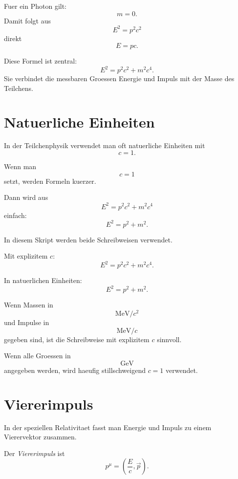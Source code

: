 \begin{examplebox}
Fuer ein Photon gilt:
\[
    m=0.
\]
Damit folgt aus
\[
    E^2=p^2c^2
\]
direkt
\[
    E=pc.
\]
\end{examplebox}

\begin{examtipbox}
Diese Formel ist zentral:
\[
    E^2=p^2c^2+m^2c^4.
\]
Sie verbindet die messbaren Groessen Energie und Impuls mit der Masse des Teilchens.
\end{examtipbox}

\section{Natuerliche Einheiten}

In der Teilchenphysik verwendet man oft natuerliche Einheiten mit
\[
    c=1.
\]

\begin{conceptbox}
Wenn man
\[
    c=1
\]
setzt, werden Formeln kuerzer.

Dann wird aus
\[
    E^2=p^2c^2+m^2c^4
\]
einfach:
\[
    E^2=p^2+m^2.
\]
\end{conceptbox}

\begin{notebox}
In diesem Skript werden beide Schreibweisen verwendet.

Mit explizitem $c$:
\[
    E^2=p^2c^2+m^2c^4.
\]

In natuerlichen Einheiten:
\[
    E^2=p^2+m^2.
\]
\end{notebox}

\begin{examtipbox}
Wenn Massen in
\[
    \mathrm{MeV}/c^2
\]
und Impulse in
\[
    \mathrm{MeV}/c
\]
gegeben sind, ist die Schreibweise mit explizitem $c$ sinnvoll.

Wenn alle Groessen in
\[
    \mathrm{GeV}
\]
angegeben werden, wird haeufig stillschweigend $c=1$ verwendet.
\end{examtipbox}

\section{Viererimpuls}

In der speziellen Relativitaet fasst man Energie und Impuls zu einem Vierervektor
zusammen.

\begin{definitionbox}
Der \emph{Viererimpuls} ist
\[
    p^\mu
    =
    \left(
        \frac{E}{c},
        \vec p
    \right).
\]
\end{definitionbox}

